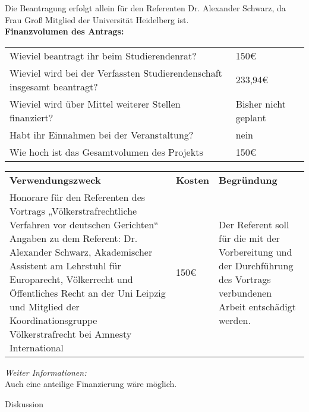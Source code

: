 {    Die Beantragung erfolgt allein für den Referenten Dr. Alexander Schwarz, da Frau Groß Mitglied der Universität Heidelberg ist.\\[1em]
    \textbf{Finanzvolumen des Antrags:}\\
    \begin{tabular}{l l}
        Wieviel beantragt ihr beim Studierendenrat?                             & 150€       \\
        Wieviel wird bei der Verfassten Studierendenschaft insgesamt beantragt? & 233,94€    \\
        Wieviel wird über Mittel weiterer Stellen finanziert?                   & Bisher nicht geplant      \\
        Habt ihr Einnahmen bei der Veranstaltung?                               & nein \\
        Wie hoch ist das Gesamtvolumen des Projekts                             & 150€\\
    \end{tabular}
    \newline
    \vspace*{2em}
    \newline
    \begin{tabular}{p{8cm} p{2cm} p{5cm}}
        \textbf{Verwendungszweck} & \textbf{Kosten} & \textbf{Begründung} \\
        Honorare für den Referenten des Vortrags „Völkerstrafrechtliche Verfahren vor deutschen Gerichten“
        \newline Angaben zu dem Referent:\newline
        Dr. Alexander Schwarz, Akademischer Assistent am Lehrstuhl für Europarecht, Völkerrecht und Öffentliches Recht an der Uni Leipzig und Mitglied der Koordinationsgruppe Völkerstrafrecht bei Amnesty International
        & 150€ & Der Referent soll für die mit der Vorbereitung und der Durchführung des Vortrags verbundenen Arbeit entschädigt werden.\\  
    \end{tabular}
    \emph{Weiter Informationen:}\\
    Auch eine anteilige Finanzierung wäre möglich.
}{
    Diskussion
}
